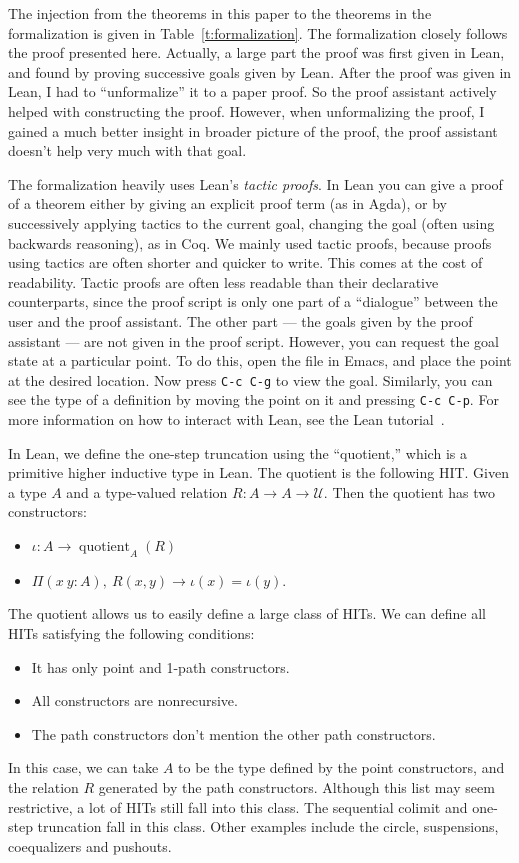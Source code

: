 \documentclass[square]{sigplanconf}
\newcommand{\fa}[2]{\ensuremath{\Pi(#1),\ #2}}
\DeclareMathOperator{\quotient}{quotient}
\newcommand{\U}{\mathcal{U}}
\theoremstyle{definition}
\theoremstyle{remark}
\begin{document}
The injection from the theorems in this paper to the theorems in the formalization is given in
Table~\ref{t:formalization}. The formalization closely follows the proof presented here. Actually, a
large part the proof was first given in Lean, and found by proving successive goals given by
Lean. After the proof was given in Lean, I had to ``unformalize'' it to a paper proof. So the proof
assistant actively helped with constructing the proof. However, when unformalizing the proof, I
gained a much better insight in broader picture of the proof, the proof assistant doesn't help very
much with that goal.

The formalization heavily uses Lean's \emph{tactic proofs}. In Lean you can give a proof of a
theorem either by giving an explicit proof term (as in Agda), or by successively applying tactics to
the current goal, changing the goal (often using backwards reasoning), as in Coq. We mainly used
tactic proofs, because proofs using tactics are often shorter and quicker to write. This comes at
the cost of readability. Tactic proofs are often less readable than their declarative counterparts,
since the proof script is only one part of a ``dialogue'' between the user and the proof
assistant. The other part --- the goals given by the proof assistant --- are not given in the proof
script. However, you can request the goal state at a particular point. To do this, open the file in
Emacs, and place the point at the desired location. Now press \texttt{C-c C-g} to view the
goal. Similarly, you can see the type of a definition by moving the point on it and pressing
\texttt{C-c C-p}. For more information on how to interact with Lean, see the Lean
tutorial~\cite{Avigad2015tutorial}.

In Lean, we define the one-step truncation using the ``quotient,'' which is a primitive higher
inductive type in Lean. The quotient is the following HIT. Given a type $A$ and a type-valued
relation $R : A \to A \to \U$. Then the quotient has two constructors:
\begin{itemize}
\item $\iota : A \to \quotient_A(R)$
\item $\fa{x\ y : A}{R(x,y)\to\iota(x)=\iota(y)}$.
\end{itemize}
The quotient allows us to easily define a large class of HITs. We can define all HITs satisfying the
following conditions:
\begin{itemize}
\item It has only point and 1-path constructors.
\item All constructors are nonrecursive.
\item The path constructors don't mention the other path constructors.
\end{itemize}
In this case, we can take $A$ to be the type defined by the point constructors, and the relation $R$
generated by the path constructors. Although this list may seem restrictive, a lot of HITs still
fall into this class. The sequential colimit and one-step truncation fall in this class. Other
examples include the circle, suspensions, coequalizers and pushouts.
\end{document}
